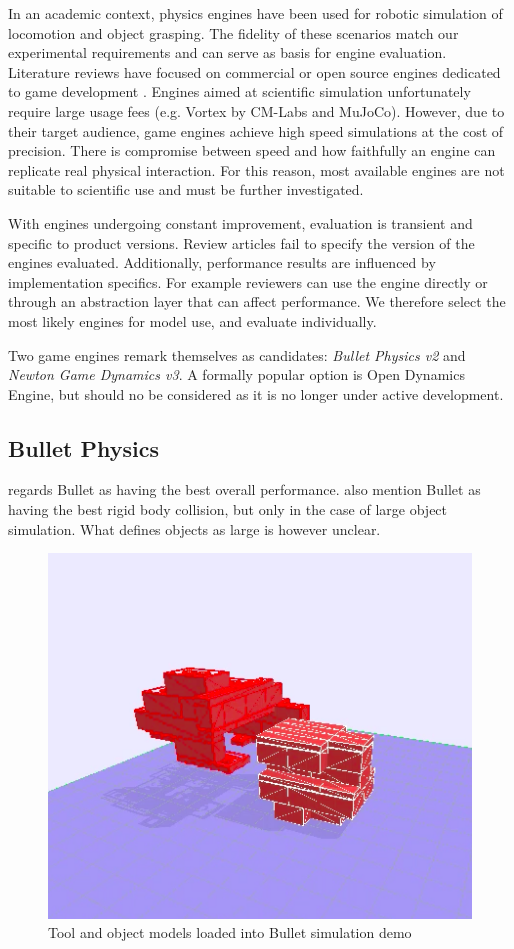 \documentclass[11]{article}
\begin{document}
In an academic context, physics engines have been used for robotic simulation of locomotion and object grasping.
The fidelity of these scenarios match our experimental requirements and can serve as basis for engine evaluation. 
Literature reviews have focused on commercial or open source engines dedicated to game development \cite{boeing2007,roennau2013,hummel2012}. 
Engines aimed at scientific simulation unfortunately require large usage fees (e.g. Vortex by CM-Labs and MuJoCo).
However, due to their target audience, game engines achieve high speed simulations at the cost of precision. 
There is compromise between speed and how faithfully an engine can replicate real physical interaction.
For this reason, most available engines are not suitable to scientific use and must be further investigated. 

With engines undergoing constant improvement, evaluation is transient and specific to product versions. 
Review articles fail to specify the version of the engines evaluated.
Additionally, performance results are influenced by implementation specifics.
For example reviewers can use the engine directly or through an abstraction layer that can affect performance.  
We therefore select the most likely engines for model use, and evaluate individually. 

Two game engines remark themselves as candidates: \emph{Bullet Physics v2} and \emph{Newton Game Dynamics v3}.
A formally popular option is Open Dynamics Engine, but should no be considered as it is no longer under active development. 

\subsection{Bullet Physics}
\cite{boeing2007} regards Bullet as having the best overall performance. 
\cite{hummel2012,roennau2013} also mention Bullet as having the best rigid body collision, but only in the case of large object simulation.
What defines objects as large is however unclear. 

\begin{figure}[h]
  \centering
  \includegraphics[width=.5\textwidth]{figures/bullet_demo.png}
  \caption{Tool and object models loaded into Bullet simulation demo}
  \label{fig:bullet_demo}
\end{figure}      
\end{document}
